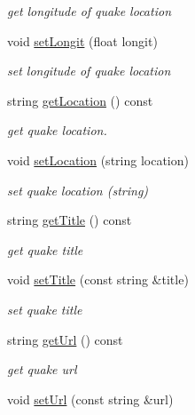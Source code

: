 \begin{DoxyCompactItemize}
\begin{DoxyCompactList}\small\item\em get longitude of quake location \end{DoxyCompactList}\item 
void \mbox{\hyperlink{classbridges_1_1dataset_1_1_earthquake_u_s_g_s_a80ceea5c1ae15e7fd075ded145a14779}{set\+Longit}} (float longit)
\begin{DoxyCompactList}\small\item\em set longitude of quake location \end{DoxyCompactList}\item 
string \mbox{\hyperlink{classbridges_1_1dataset_1_1_earthquake_u_s_g_s_a56f3fede61e32b4bc35874435c59fc0e}{get\+Location}} () const
\begin{DoxyCompactList}\small\item\em get quake location. \end{DoxyCompactList}\item 
void \mbox{\hyperlink{classbridges_1_1dataset_1_1_earthquake_u_s_g_s_a88ad0700837cc78896eed2033e53d9a0}{set\+Location}} (string location)
\begin{DoxyCompactList}\small\item\em set quake location (string) \end{DoxyCompactList}\item 
string \mbox{\hyperlink{classbridges_1_1dataset_1_1_earthquake_u_s_g_s_a3e63533e53a119ceeb98c97ff35abc4a}{get\+Title}} () const
\begin{DoxyCompactList}\small\item\em get quake title \end{DoxyCompactList}\item 
void \mbox{\hyperlink{classbridges_1_1dataset_1_1_earthquake_u_s_g_s_a8a479d05e3f3896d4eeaad1bcccf9f02}{set\+Title}} (const string \&title)
\begin{DoxyCompactList}\small\item\em set quake title \end{DoxyCompactList}\item 
string \mbox{\hyperlink{classbridges_1_1dataset_1_1_earthquake_u_s_g_s_ab009982ed697df7ea2c913eb2b7e88be}{get\+Url}} () const
\begin{DoxyCompactList}\small\item\em get quake url \end{DoxyCompactList}\item 
void \mbox{\hyperlink{classbridges_1_1dataset_1_1_earthquake_u_s_g_s_aecb3cb7e4dba2315fed2a4a316a1fac9}{set\+Url}} (const string \&url)

\end{DoxyCompactItemize}
